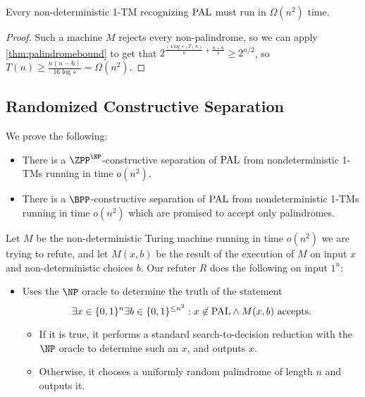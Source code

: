 \begin{corollary}
\label{cor:palindromebound}
Every non-deterministic 1-TM recognizing $\mathrm{PAL}$ must run in $\Omega(n^2)$ time.
\end{corollary}
\begin{proof}
Such a machine $M$ rejects every non-palindrome, so we can apply \cref{thm:palindromebound} to get that
$2^{\frac{(4 \log s) T(n)}{n} + \frac{n+6}{4}} \geq 2^{n/2}$, so $T(n) \geq \frac{n(n-6)}{16 \log s} = \Omega(n^2)$.
\end{proof}



\subsection{Randomized Constructive Separation}

We prove the following: 

\begin{theorem}
    \begin{itemize}
    \item There is a $\ZPP^\NP$-constructive separation of $\mathrm{PAL}$ from nondeterministic 1-TMs 
    running in time $o(n^2)$. 
    \item There is a $\BPP$-constructive separation of $\mathrm{PAL}$ from nondeterministic 1-TMs 
    running in time $o(n^2)$ which
    are promised to accept only palindromes. 
    \end{itemize}
\end{theorem}

Let $M$ be the non-deterministic Turing machine running in time $o(n^2)$ we are trying to refute, 
and let $M(x, b)$ be the result of the execution of $M$ on input $x$ and non-deterministic choices $b$.
Our refuter $R$ does the following on input $1^n$:

\begin{itemize}
	\item Uses the $\NP$ oracle to determine the truth of the statement 
	$$\exists x \in \{0, 1\}^n \exists b \in \{0, 1\}^{\leq n^2} : x \not\in \mathrm{PAL} \wedge M(x, b) \text{ accepts}.$$ 
	\begin{itemize}
	\item If it is true, it performs a standard search-to-decision 
	reduction with the $\NP$ oracle to determine such an $x$, and outputs $x$.
	\item Otherwise, it chooses a uniformly random palindrome of length $n$ and outputs it. 
	\end{itemize}
\end{itemize}

